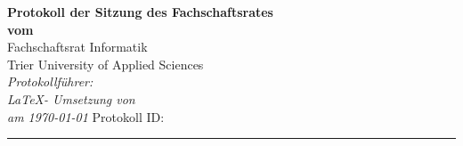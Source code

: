 	\doublespacing
	\thispagestyle{empty}
	
	\begin{center}
		\logoPath
	
	\vspace*{\fill}
	{\LARGE \textbf{Protokoll der Sitzung des Fachschaftsrates\\
			vom \dateOfMeeting}}\\
	Fachschaftsrat Informatik\\
	Trier University of Applied Sciences\\
	\vspace{2.5cm}
	\textit{
		Protokollführer: \textbf{\protokoller} \\
		\LaTeX - Umsetzung von \TeXer\\
		am \today
	}
	Protokoll ID: \textbf{\protocolID}
	\vfill
\end{center}

\hspace*{-35cm}
\textcolor{hlcolor}{\rule{64.9cm}{15pt}}